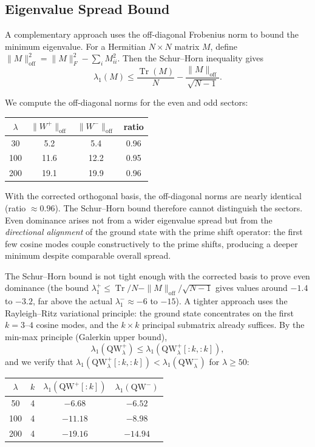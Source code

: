 \documentclass[12pt,a4paper]{article}
\theoremstyle{definition}
\theoremstyle{remark}
\begin{document}
\subsection{Eigenvalue Spread Bound}

A complementary approach uses the off-diagonal Frobenius norm to bound the minimum eigenvalue. For a Hermitian $N \times N$ matrix $M$, define $\|M\|_{\mathrm{off}}^2 = \|M\|_F^2 - \sum_i M_{ii}^2$. Then the Schur--Horn inequality gives
\[ \lambda_1(M) \leq \frac{\operatorname{Tr}(M)}{N} - \frac{\|M\|_{\mathrm{off}}}{\sqrt{N-1}}. \]

We compute the off-diagonal norms for the even and odd sectors:

\begin{center}
\begin{tabular}{cccc}
$\lambda$ & $\|W^+\|_{\mathrm{off}}$ & $\|W^-\|_{\mathrm{off}}$ & ratio \\
\hline
30  & 5.2 & 5.4 & 0.96 \\
100 & 11.6 & 12.2 & 0.95 \\
200 & 19.1 & 19.9 & 0.96
\end{tabular}
\end{center}

With the corrected orthogonal basis, the off-diagonal norms are nearly identical (ratio $\approx 0.96$). The Schur--Horn bound therefore cannot distinguish the sectors. Even dominance arises not from a wider eigenvalue spread but from the \emph{directional alignment} of the ground state with the prime shift operator: the first few cosine modes couple constructively to the prime shifts, producing a deeper minimum despite comparable overall spread.

The Schur--Horn bound is not tight enough with the corrected basis to prove even dominance (the bound $\lambda_1^+ \leq \operatorname{Tr}/N - \|M\|_{\mathrm{off}}/\sqrt{N-1}$ gives values around $-1.4$ to $-3.2$, far above the actual $\lambda_1^- \approx -6$ to $-15$). A tighter approach uses the Rayleigh--Ritz variational principle: the ground state concentrates on the first $k = 3$--$4$ cosine modes, and the $k \times k$ principal submatrix already suffices. By the min-max principle (Galerkin upper bound),
\[ \lambda_1(\mathrm{QW}_\lambda^+) \leq \lambda_1(\mathrm{QW}_\lambda^+[{:}k,{:}k]), \]
and we verify that $\lambda_1(\mathrm{QW}_\lambda^+[{:}k,{:}k]) < \lambda_1(\mathrm{QW}_\lambda^-)$ for $\lambda \geq 50$:

\begin{center}
\begin{tabular}{cccc}
$\lambda$ & $k$ & $\lambda_1(\mathrm{QW}^+[{:}k])$ & $\lambda_1(\mathrm{QW}^-)$ \\
\hline
50  & 4 & $-6.68$ & $-6.52$ \\
100 & 4 & $-11.18$ & $-8.98$ \\
200 & 4 & $-19.16$ & $-14.94$
\end{tabular}
\end{center}
\end{document}
